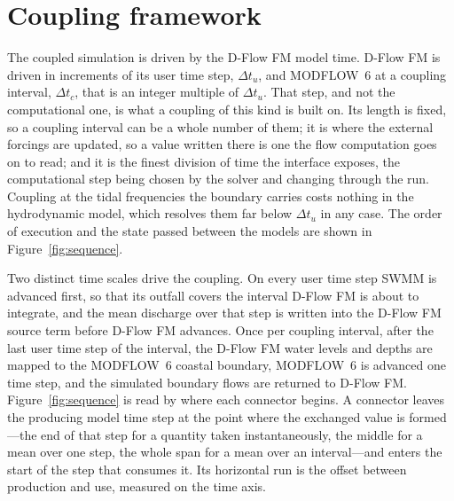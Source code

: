 \documentclass[preprint,authoryear,11pt]{elsarticle}
\begin{document}
\section{Coupling framework}

The coupled simulation is driven by the D-Flow FM model time. D-Flow FM is driven in increments of its user time step, $\Delta t_u$, and MODFLOW~6 at a coupling interval, $\Delta t_c$, that is an integer multiple of $\Delta t_u$. That step, and not the computational one, is what a coupling of this kind is built on. Its length is fixed, so a coupling interval can be a whole number of them; it is where the external forcings are updated, so a value written there is one the flow computation goes on to read; and it is the finest division of time the interface exposes, the computational step being chosen by the solver and changing through the run. Coupling at the tidal frequencies the boundary carries costs nothing in the hydrodynamic model, which resolves them far below $\Delta t_u$ in any case. The order of execution and the state passed between the models are shown in Figure~\ref{fig:sequence}.

Two distinct time scales drive the coupling. On every user time step SWMM is advanced first, so that its outfall covers the interval D-Flow FM is about to integrate, and the mean discharge over that step is written into the D-Flow FM source term before D-Flow FM advances. Once per coupling interval, after the last user time step of the interval, the D-Flow FM water levels and depths are mapped to the MODFLOW~6 coastal boundary, MODFLOW~6 is advanced one time step, and the simulated boundary flows are returned to D-Flow FM. Figure~\ref{fig:sequence} is read by where each connector begins. A connector leaves the producing model time step at the point where the exchanged value is formed---the end of that step for a quantity taken instantaneously, the middle for a mean over one step, the whole span for a mean over an interval---and enters the start of the step that consumes it. Its horizontal run is the offset between production and use, measured on the time axis.
\end{document}
